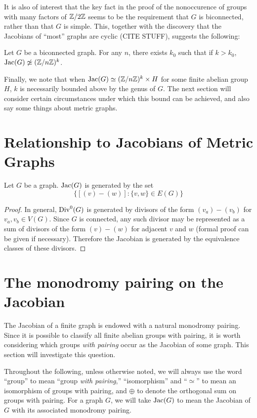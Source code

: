 \documentclass{amsart}
\begin{document}
It is also of interest that the key fact in the proof of the
nonoccurence of groups with many factors of $\mathbb{Z}/2\mathbb{Z}$ seems to be the
requirement that $G$ is biconnected, rather than that $G$ is
simple. This, together with the discovery that the Jacobians of
``most'' graphs are cyclic (CITE STUFF), suggests the following:

\begin{conj}
  Let $G$ be a biconnected graph. For any $n$, there exists $k_0$ such
  that if $k > k_0$, $\operatorname{Jac}(G) \not\simeq (\mathbb{Z}/n\mathbb{Z})^k$.
\end{conj}

Finally, we note that when $\operatorname{Jac}(G) \simeq (\mathbb{Z}/n\mathbb{Z})^k \times H$ for
some finite abelian group $H$, $k$ is necessarily bounded above by the
genus of $G$. The next section will consider certain circumstances
under which this bound can be achieved, and also say some things about
metric graphs.

\section{Relationship to Jacobians of Metric Graphs}
\begin{lem}
  \label{lem:jac_generators}
  Let $G$ be a graph. $\operatorname{Jac}(G)$ is generated by the set \[\{[(v) -
  (w)]: \{v, w\} \in E(G)\}\]
\end{lem}

\begin{proof}
  In general, $\operatorname{Div}^0(G)$ is generated by divisors of the form $(v_a)
  - (v_b)$ for $v_a, v_b \in V(G)$. Since $G$ is connected, any such
  divisor may be represented as a sum of divisors of the form $(v) -
  (w)$ for adjacent $v$ and $w$ (formal proof can be given if
  necessary). Therefore the Jacobian is generated by the equivalence
  classes of these divisors.  
\end{proof}

\section{The monodromy pairing on the Jacobian}

The Jacobian of a finite graph is endowed with a natural monodromy
pairing. Since it is possible to classify all finite abelian groups
with pairing, it is worth considering which groups \emph{with pairing}
occur as the Jacobian of some graph. This section will investigate
this question.

\begin{note}
  Throughout the following, unless otherwise noted, we will always use
  the word ``group'' to mean ``group \emph{with pairing},''
  ``isomorphism'' and ``$\simeq$'' to mean an isomorphism of groups
  with pairing, and $\oplus$ to denote the orthogonal sum on groups
  with pairing. For a graph $G$, we will take $\operatorname{Jac}(G)$ to mean the
  Jacobian of $G$ with its associated monodromy pairing.
\end{note}
\end{document}
